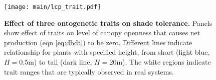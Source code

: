 \documentclass[a4paper,11pt]{article}
\begin{document}
\newpage

\begin{figure}[ht]
\centering
\texttt{[image: main/lcp\_trait.pdf]}
\caption{\textbf{Effect of three ontogenetic traits on shade tolerance.}
Panels show effect of traits on level of canopy openness that causes net production (eqn \ref{eq:dbdt}) to be zero. Different lines indicate relationship for plants with specified height, from short (light blue,  $H=0.5$m) to tall (dark line, $H=20$m). The white regions indicate trait ranges that are typically observed in real systems.
\label{fig:wplcp}}
\end{figure}

\clearpage

\footnotesize


\end{document}
